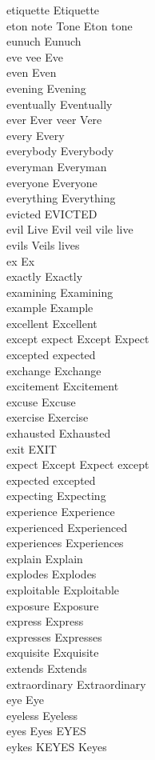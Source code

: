 etiquette Etiquette\\
eton note Tone Eton tone\\
eunuch Eunuch\\
eve vee Eve\\
even Even\\
evening Evening\\
eventually Eventually\\
ever Ever veer Vere\\
every Every\\
everybody Everybody\\
everyman Everyman\\
everyone Everyone\\
everything Everything\\
evicted EVICTED\\
evil Live Evil veil vile live\\
evils Veils lives\\
ex Ex\\
exactly Exactly\\
examining Examining\\
example Example\\
excellent Excellent\\
except expect Except Expect\\
excepted expected\\
exchange Exchange\\
excitement Excitement\\
excuse Excuse\\
exercise Exercise\\
exhausted Exhausted\\
exit EXIT\\
expect Except Expect except\\
expected excepted\\
expecting Expecting\\
experience Experience\\
experienced Experienced\\
experiences Experiences\\
explain Explain\\
explodes Explodes\\
exploitable Exploitable\\
exposure Exposure\\
express Express\\
expresses Expresses\\
exquisite Exquisite\\
extends Extends\\
extraordinary Extraordinary\\
eye Eye\\
eyeless Eyeless\\
eyes Eyes EYES\\
eykes KEYES Keyes\\

